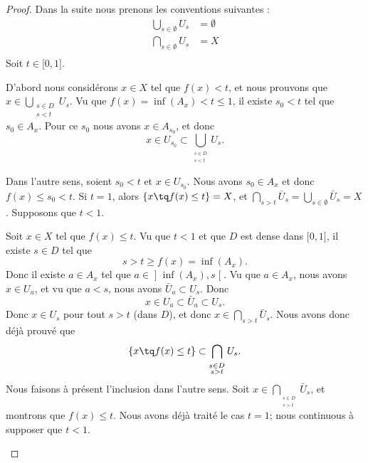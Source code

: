 \begin{proof}
	Dans la suite nous prenons les conventions suivantes :
	\begin{subequations}
		\begin{align}
			\bigcup_{s\in\emptyset}U_s & =\emptyset \\
			\bigcap_{s\in\emptyset}U_s & =X         \\
		\end{align}
	\end{subequations}
	Soit \( t\in\mathopen[ 0 , 1 \mathclose]\).
	\begin{subproof}
		\spitem[\( \{ x\tq f(x)<t \}=\bigcup_{s<t}U_s\)]
		D'abord nous considérons \( x\in X\) tel que \( f(x)<t\), et nous prouvons que $x\in\bigcup_{\substack{s\in D\\s<t}}U_s$. Vu que \( f(x)=\inf(A_x)<t\leq 1\), il existe \( s_0<t\) tel que \( s_0\in A_x\). Pour ce \( s_0\) nous avons \( x\in A_{s_0}\), et donc
		\begin{equation}
			x\in U_{s_0}\subset\bigcup_{_{\substack{s\in D\\s<t}}}U_s.
		\end{equation}

		Dans l'autre sens, soient \( s_0<t\) et \( x\in U_{s_0}\). Nous avons \( s_0\in A_x\) et donc \( f(x)\leq s_0<t\).
		\spitem[\( \{ x\tq f(x)\leq t \}=\bigcup_{s>t}\bar U_s\)]
		Si \( t=1\), alors \( \{ x\tq f(x)\leq t \}=X\), et \( \bigcap_{s>t}\bar U_s=\bigcup_{s\in\emptyset}\bar U_s=X\). Supposons que \( t<1\).

		Soit \( x\in X\) tel que \( f(x)\leq t\). Vu que \( t<1\) et que \( D\) est dense dans \( \mathopen[ 0 , 1 \mathclose]\), il existe \( s\in D\) tel que
		\begin{equation}
			s>t\geq f(x)=\inf(A_x).
		\end{equation}
		Donc il existe \( a\in A_x\) tel que \( a\in\mathopen] \inf(A_x) , s \mathclose[\). Vu que \( a\in A_x\), nous avons \( x\in U_a\), et vu que \( a<s\), nous avons \( \bar U_a\subset U_s\). Donc
			\begin{equation}
				x\in U_a\subset\bar U_a\subset U_s.
			\end{equation}
			Donc \( x\in U_s\) pour tout \( s>t\) (dans \( D\)), et donc \( x\in\bigcap_{s>t}\bar U_s\). Nous avons donc déjà prouvé que
			\begin{equation}
				\{ x\tq f(x)\leq t \}\subset\bigcap_{_{\substack{s\in D\\s>t}}}U_s.
			\end{equation}
			Nous faisons à présent l'inclusion dans l'autre sens. Soit \( x\in \bigcap_{_{\substack{s\in D\\s>t}}}\bar U_s\), et montrons que \( f(x)\leq t\). Nous avons déjà traité le cas \( t=1\); nous continuous à supposer que \( t<1\).


\end{subproof}
\end{proof}
